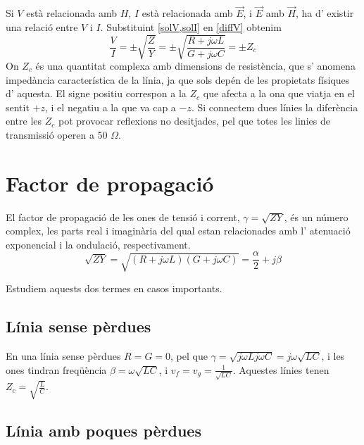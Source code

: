 Si $V$ està relacionada amb $H$, $I$ està relacionada amb $\vec E$, i $\vec E$ amb $\vec H$, ha d' existir una relació entre $V$ i $I$. Substituint \cref{solV,solI} en \cref{diffV} obtenim
\begin{equation}
  \frac{V}{I} = \pm\sqrt{\frac{Z}{Y}} = \pm\sqrt{\frac{R+j\omega L}{G + j\omega C}} = \pm Z_c
\end{equation}
On $Z_c$ és una quantitat complexa amb dimensions de resistència, que s' anomena impedància característica de la línia, ja que sols depén de les propietats físiques d' aquesta. El signe positiu correspon a la $Z_c$ que afecta a la ona que viatja en el sentit $+z$, i el negatiu a la que va cap a $-z$. Si connectem dues línies la diferència entre les $Z_c$ pot provocar reflexions no desitjades, pel que totes les linies de transmissió operen a 50 $\Omega $.

\section{Factor de propagació}

El factor de propagació de les ones de tensió i corrent, $\gamma = \sqrt{ZY}$, és un número complex, les parts real i imaginària del qual estan relacionades amb l' atenuació exponencial i la ondulació, respectivament.
\begin{equation}
  \sqrt{ ZY }= \sqrt{(R + j \omega L)(G + j\omega C)} = \frac{\alpha}{2} + j \beta
\end{equation}

Estudiem aquests dos termes en casos importants.

\subsection{Línia sense pèrdues}

En una línia sense pèrdues $R = G = 0$, pel que $\gamma = \sqrt{j\omega Lj\omega C} = j\omega \sqrt{LC}$, i les ones tindran freqüència $\beta = \omega \sqrt{LC}$, i $v_f = v_g = \frac{1}{\sqrt{LC}}$. Aquestes línies tenen $Z_c = \sqrt{\frac{L}{C}}$.

\subsection{Línia amb poques pèrdues}


